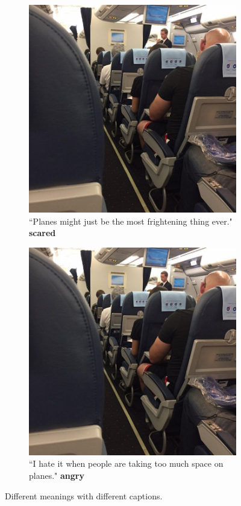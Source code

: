 \begin{figure}[H]
    \begin{subfigure}{.5\textwidth}
        \centering
        \includegraphics[width=0.9\linewidth]{Images/scared.jpg}
        \caption{``Planes might just be the most frightening thing ever." \textbf{scared}}
    \end{subfigure}
    \begin{subfigure}{.5\textwidth}
        \centering
        \includegraphics[width=0.9\linewidth]{Images/scared.jpg}
        \caption{``I hate it when people are taking too much space on planes." \textbf{angry}}
    \end{subfigure}
    \caption{Different meanings with different captions.}
    \label{ambiguous}
\end{figure}

